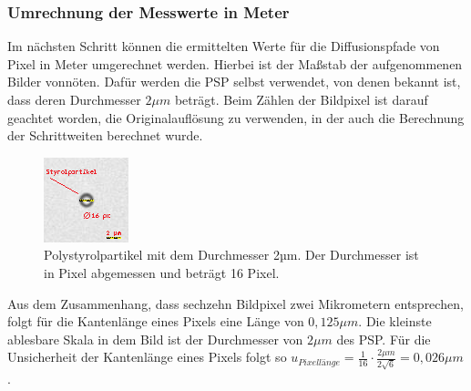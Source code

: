 \documentclass[
  9pt,
]{article}
\begin{document}
\hypertarget{umrechnung-der-messwerte-in-meter}{%
\subsubsection{Umrechnung der Messwerte in
Meter}\label{umrechnung-der-messwerte-in-meter}}

Im nächsten Schritt können die ermittelten Werte für die Diffusionspfade
von Pixel in Meter umgerechnet werden. Hierbei ist der Maßstab der
aufgenommenen Bilder vonnöten. Dafür werden die PSP selbst verwendet,
von denen bekannt ist, dass deren Durchmesser \(2 \mu m\) beträgt. Beim
Zählen der Bildpixel ist darauf geachtet worden, die Originalauflösung
zu verwenden, in der auch die Berechnung der Schrittweiten berechnet
wurde.

\begin{figure}
\centering
\includegraphics[width=\textwidth,height=0.28\textheight]{Bilder/styrolpartikel.png}
\caption{Polystyrolpartikel mit dem Durchmesser 2µm. Der Durchmesser ist
in Pixel abgemessen und beträgt 16 Pixel.}
\end{figure}

Aus dem Zusammenhang, dass sechzehn Bildpixel zwei Mikrometern
entsprechen, folgt für die Kantenlänge eines Pixels eine Länge von
\(0,125 \mu m\). Die kleinste ablesbare Skala in dem Bild ist der
Durchmesser von \(2\mu m\) des PSP. Für die Unsicherheit der Kantenlänge
eines Pixels folgt so
\(u_{Pixellänge} = \frac{1}{16}\cdot \frac{2\mu m}{2\sqrt{6}} = 0,026\mu m\).
\end{document}
